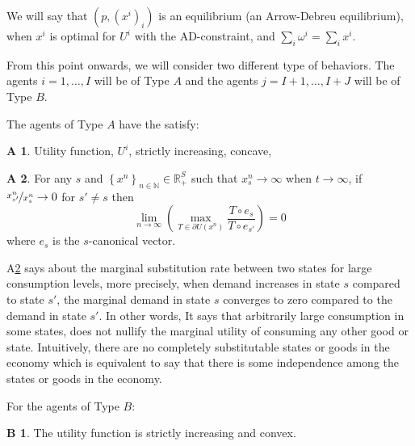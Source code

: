 \documentclass[pdftex]{article}
\numberwithin{equation}{section}
\theoremstyle{th}
\newtheorem{proof lemma}{{Proof Lemma}.}
\theoremstyle{definition}
\newtheorem{A}{A\hspace{-0.15cm}}
\newtheorem{B}{B\hspace{-0.15cm}}
\begin{document}
We will say that $\left(p,\left(x^i\right)_i\right)$ is an equilibrium (an Arrow-Debreu equilibrium), when $x^i$ is optimal for $U^i$ with the AD-constraint, and $\sum_i\omega^i=\sum_ix^i.$



From this point onwards, we will consider two different type of behaviors. The agents $i=1,\dots,I$ will be of Type $A$ and the agents $j=I+1,\dots,I+J$ will be of  Type $B$.

The agents of Type $A$ have the satisfy:
\begin{A} \label{A1}Utility function, $U^i$, strictly increasing, concave,\end{A}
\begin{A} \label{A2} For any $s$ and \label{eqA3}$\left\{ x^{n}\right\}_{n\in\mathbb{N}}\in\mathbb{R}_{+}^{S}$ such that $x_{s}^{n}\rightarrow\infty$ when $t\rightarrow\infty$, if $\nicefrac{x_{s'}^{n}}{x_{s}^{n}}\rightarrow0$ for $s'\neq{s}$ then\begin{equation}\lim_{n\rightarrow\infty}\left(\max_{T\in\partial{U\left(x^{n}\right)}}\frac{T\circ{e}_{s}}{T\circ{e}_{s'}}\right)=0\end{equation}
where $e_{s}$ is the $s$-canonical vector.
\end{A}

A\ref{A2} says about the marginal substitution rate between two states for large consumption levels, more precisely, when demand increases in state $s$ compared to state $s'$, the marginal demand in state $s$ converges to zero compared to the demand in state $s'$. In other words, It says that arbitrarily large consumption in some states, does not nullify the marginal utility of consuming any other good or state. Intuitively, there are no completely substitutable states or goods in the economy which is equivalent to say that there is some independence among the states or goods in the economy.

For the agents of Type $B$:
\begin{B} The utility function is strictly increasing and convex.\end{B}
\end{document}
